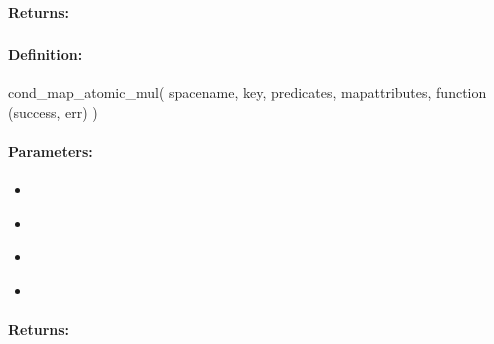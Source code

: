 \paragraph{Returns:}


\pagebreak
\subsubsection{}
\label{api:nodejs:cond_map_atomic_mul}


\paragraph{Definition:}
\begin{javascriptcode}
cond_map_atomic_mul(
        spacename, key, predicates, mapattributes, function (success, err) {})
\end{javascriptcode}
\paragraph{Parameters:}
\begin{itemize}[noitemsep]
\item {}\\

\item {}\\

\item {}\\

\item {}\\

\end{itemize}

\paragraph{Returns:}


\pagebreak
\subsubsection{}
\label{api:nodejs:map_atomic_div}


